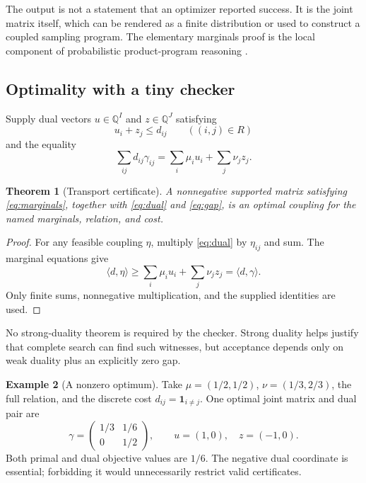 \documentclass[11pt,letterpaper]{article}
\newtheorem{theorem}{Theorem}[section]
\theoremstyle{definition}\newtheorem{definition}[theorem]{Definition}
\newtheorem{example}[theorem]{Example}
\theoremstyle{remark}\newtheorem{remark}[theorem]{Remark}
\newcommand{\Q}{\mathbb Q}\newcommand{\R}{\mathbb R}\newcommand{\N}{\mathbb N}
\newcommand{\ind}{\mathbf 1}\newcommand{\forge}{\texttt{forge}}
\begin{document}
The output is not a statement that an optimizer reported success. It is the joint matrix itself, which can be rendered as a finite distribution or used to construct a coupled sampling program. The elementary marginals proof is the local component of probabilistic product-program reasoning \cite{coupling}.

\subsection{Optimality with a tiny checker}
Supply dual vectors $u\in\Q^I$ and $z\in\Q^J$ satisfying
\begin{equation}\label{eq:dual}
 u_i+z_j\le d_{ij}\qquad((i,j)\in R)
\end{equation}
and the equality
\begin{equation}\label{eq:gap}
 \sum_{ij}d_{ij}\gamma_{ij}
 =\sum_i\mu_i u_i+\sum_j\nu_j z_j.
\end{equation}

\begin{theorem}[Transport certificate]
A nonnegative supported matrix satisfying \eqref{eq:marginals}, together with \eqref{eq:dual} and \eqref{eq:gap}, is an optimal coupling for the named marginals, relation, and cost.
\end{theorem}
\begin{proof}
For any feasible coupling $\eta$, multiply \eqref{eq:dual} by $\eta_{ij}$ and sum. The marginal equations give
\[
 \langle d,\eta\rangle
 \ge\sum_i\mu_i u_i+\sum_j\nu_j z_j
 =\langle d,\gamma\rangle.
\]
Only finite sums, nonnegative multiplication, and the supplied identities are used.
\end{proof}
No strong-duality theorem is required by the checker. Strong duality helps justify that complete search can find such witnesses, but acceptance depends only on weak duality plus an explicitly zero gap.

\begin{example}[A nonzero optimum]
Take $\mu=(1/2,1/2)$, $\nu=(1/3,2/3)$, the full relation, and the discrete cost $d_{ij}=\ind_{i\ne j}$. One optimal joint matrix and dual pair are
\[
 \gamma=\begin{pmatrix}1/3&1/6\\0&1/2\end{pmatrix},
 \qquad u=(1,0),\quad z=(-1,0).
\]
Both primal and dual objective values are $1/6$. The negative dual coordinate is essential; forbidding it would unnecessarily restrict valid certificates.
\end{example}
\end{document}
